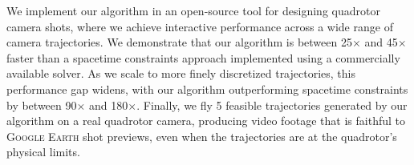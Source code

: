 We implement our algorithm in an open-source tool for designing quadrotor camera shots, where we achieve interactive performance across a wide range of camera trajectories.
We demonstrate that our algorithm is between 25$\times$ and 45$\times$ faster than a spacetime constraints approach implemented using a commercially available solver.
As we scale to more finely discretized trajectories, this performance gap widens, with our algorithm outperforming spacetime constraints by between 90$\times$ and 180$\times$.
Finally, we fly 5 feasible trajectories generated by our algorithm on a real quadrotor camera, producing video footage that is faithful to \textsc{Google Earth} shot previews, even when the trajectories are at the quadrotor's physical limits.
